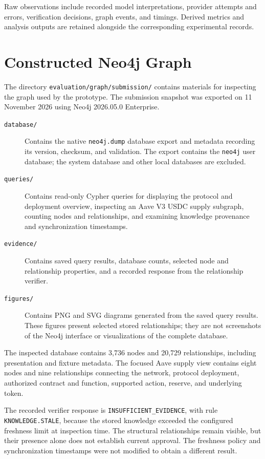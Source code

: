 Raw observations include recorded model interpretations, provider
attempts and errors, verification decisions, graph events, and
timings. Derived metrics and analysis outputs are retained alongside
the corresponding experimental records.

\section{Constructed Neo4j Graph}

The directory \texttt{evaluation/graph/submission/} contains
materials for inspecting the graph used by the prototype.
The submission snapshot was exported on 11 November 2026 using
Neo4j 2026.05.0 Enterprise.

\begin{description}
    \item[\texttt{database/}]
    Contains the native \texttt{neo4j.dump} database export and
    metadata recording its version, checksum, and validation.
    The export contains the \texttt{neo4j} user database;
    the system database and other local databases are excluded.

    \item[\texttt{queries/}]
    Contains read-only Cypher queries for displaying the protocol
    and deployment overview, inspecting an Aave V3 USDC supply
    subgraph, counting nodes and relationships, and examining
    knowledge provenance and synchronization timestamps.

    \item[\texttt{evidence/}]
    Contains saved query results, database counts, selected node
    and relationship properties, and a recorded response from the
    relationship verifier.

    \item[\texttt{figures/}]
    Contains PNG and SVG diagrams generated from the saved query
    results. These figures present selected stored relationships;
    they are not screenshots of the Neo4j interface or
    visualizations of the complete database.
\end{description}

The inspected database contains 3,736 nodes and 20,729 relationships,
including presentation and fixture metadata. The focused Aave supply
view contains eight nodes and nine relationships connecting the
network, protocol deployment, authorized contract and function,
supported action, reserve, and underlying token.

The recorded verifier response is
\texttt{INSUFFICIENT\_EVIDENCE}, with rule
\texttt{KNOWLEDGE.STALE}, because the stored knowledge exceeded the
configured freshness limit at inspection time. The structural
relationships remain visible, but their presence alone does not
establish current approval. The freshness policy and synchronization
timestamps were not modified to obtain a different result.

